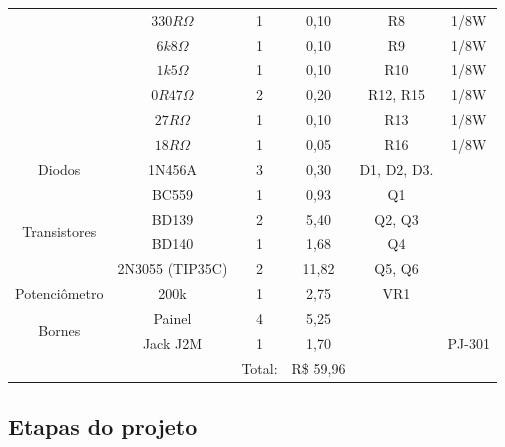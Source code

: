 \documentclass[a4paper,12pt,oneside,openany,table,xcdraw]{article}
\begin{document}
\begin{table}[H]
{\begin{tabular}{cc|c|c|cc}
\multicolumn{1}{|c|}{} & $330R \Omega$ & 1 & 0,10 & \multicolumn{1}{c|}{R8} & \multicolumn{1}{c|}{1/8W} \\ \cline{2-6} 
\multicolumn{1}{|c|}{} & $6k8 \Omega$ & 1 & 0,10 & \multicolumn{1}{c|}{R9} & \multicolumn{1}{c|}{1/8W} \\ \cline{2-6} 
\multicolumn{1}{|c|}{} & $1k5 \Omega$ & 1 & 0,10 & \multicolumn{1}{c|}{R10} & \multicolumn{1}{c|}{1/8W} \\ \cline{2-6} 
\multicolumn{1}{|c|}{} & $0R47 \Omega$ & 2 & 0,20 & \multicolumn{1}{c|}{R12, R15} & \multicolumn{1}{c|}{1/8W} \\ \cline{2-6} 
\multicolumn{1}{|c|}{} & $27R \Omega$ & 1 & 0,10 & \multicolumn{1}{c|}{R13} & \multicolumn{1}{c|}{1/8W} \\ \cline{2-6} 
\multicolumn{1}{|c|}{} & $18R \Omega$ & 1 & 0,05 & \multicolumn{1}{c|}{R16} & \multicolumn{1}{c|}{1/8W} \\ \hline
\multicolumn{1}{|c|}{Diodos} & 1N456A & 3 & 0,30 & \multicolumn{1}{c|}{D1, D2, D3.} & \multicolumn{1}{c|}{} \\ \hline
\multicolumn{1}{|c|}{\multirow{4}{*}{Transistores}} & BC559 & 1 & 0,93 & \multicolumn{1}{c|}{Q1} & \multicolumn{1}{c|}{} \\ \cline{2-6} 
\multicolumn{1}{|c|}{} & BD139 & 2 & 5,40 & \multicolumn{1}{c|}{Q2, Q3} & \multicolumn{1}{c|}{} \\ \cline{2-6} 
\multicolumn{1}{|c|}{} & BD140 & 1 & 1,68 & \multicolumn{1}{c|}{Q4} & \multicolumn{1}{c|}{} \\ \cline{2-6} 
\multicolumn{1}{|c|}{} & 2N3055 (TIP35C) & 2 & 11,82 & \multicolumn{1}{c|}{Q5, Q6} & \multicolumn{1}{c|}{} \\ \hline
\multicolumn{1}{|c|}{Potenciômetro} & 200k & 1 & 2,75 & \multicolumn{1}{c|}{VR1} & \multicolumn{1}{c|}{} \\ \hline
\multicolumn{1}{|c|}{\multirow{2}{*}{Bornes}} & Painel & 4 & 5,25 & \multicolumn{1}{c|}{} & \multicolumn{1}{c|}{} \\ \cline{2-6} 
\multicolumn{1}{|c|}{} & Jack J2M & 1 & 1,70 & \multicolumn{1}{c|}{} & \multicolumn{1}{c|}{PJ-301} \\ \hline
\multicolumn{1}{l}{} &  & Total: & R\$  59,96 &  &  \\ \cline{3-4}
\end{tabular}%
}
\end{table}

\subsection{Etapas do projeto}
\end{document}
